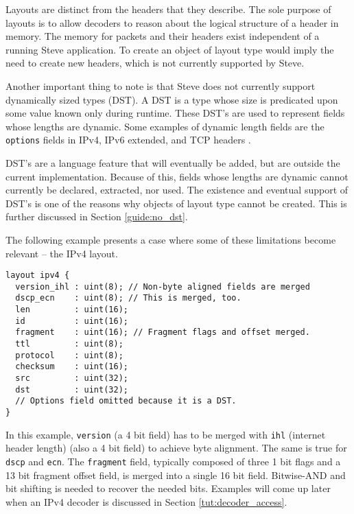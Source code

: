 Layouts are distinct from the headers that they describe.
The sole purpose of layouts is to allow decoders to reason about the logical 
structure of a header in memory.
The memory for packets and their headers exist independent of a running Steve 
application.
To create an object of layout type would imply the need to create new headers,
which is not currently supported by Steve.


Another important thing to note is that Steve does not currently support dynamically
sized types (DST). A DST is a type whose size is predicated upon some value
known only during runtime. These DST's are used to represent fields whose
lengths are dynamic. Some examples of dynamic length fields are the
\texttt{options} fields in IPv4, IPv6 extended, and TCP headers \cite{ipv4_std, ipv6_std,
tcp_std}.

DST's are a language feature that will eventually be added, but are outside the
current implementation. Because of this, fields whose lengths are dynamic cannot
currently be declared, extracted, nor used. The existence and eventual support
of DST's is one of the reasons why objects of layout type cannot be created.
This is further discussed in Section \ref{guide:no_dst}.

The following example presents a case where some of these limitations become relevant -- the IPv4 layout.

\begin{lstlisting}
layout ipv4 {
  version_ihl : uint(8); // Non-byte aligned fields are merged
  dscp_ecn    : uint(8); // This is merged, too.
  len         : uint(16);
  id          : uint(16);
  fragment    : uint(16); // Fragment flags and offset merged.
  ttl         : uint(8);
  protocol    : uint(8);
  checksum    : uint(16);
  src         : uint(32);
  dst         : uint(32);
  // Options field omitted because it is a DST.
}
\end{lstlisting}

In this example, \texttt{version} (a 4 bit field) has to be
merged with \texttt{ihl} (internet header length) (also a 4 bit field) to
achieve byte alignment. The same is true for \texttt{dscp} and \texttt{ecn}. The
\texttt{fragment} field, typically composed of three 1 bit flags and a 13 bit
fragment offset field, is merged into a single 16 bit field. 
Bitwise-AND and bit shifting is needed to recover the needed bits.
Examples will come up later when an IPv4 decoder is discussed in
Section \ref{tut:decoder_access}.

